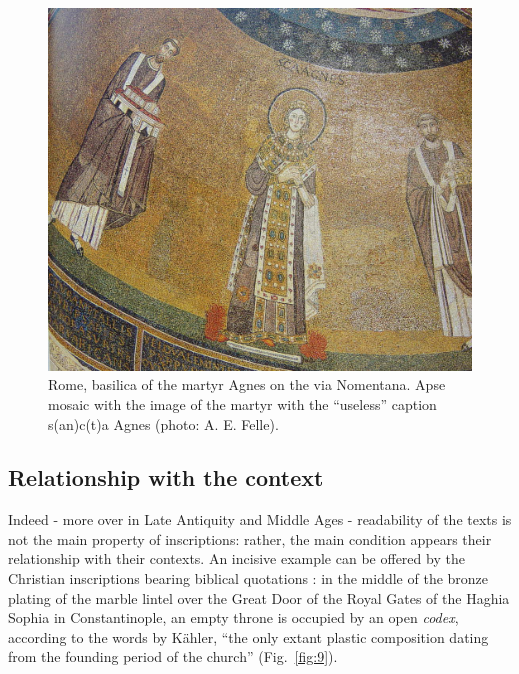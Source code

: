 \documentclass[amsthm,ebook]{saparticle}
\begin{document}
\begin{figure}[!bp]
\centering
 \includegraphics[width=\columnwidth]{FelleVisualFeaturesofinscriptionsEAGLE2016FullPaper-img011.jpg}
\caption{Rome, basilica of the martyr Agnes on the via Nomentana. Apse mosaic with the image of the martyr with the
“useless” caption  s(an)c(t)a Agnes (photo: A. E. Felle).}
\label{fig:8}
\end{figure}













\subsection{Relationship with the context}


\noindent Indeed - more over in Late Antiquity and Middle Ages - readability of the texts is not the main property of
inscriptions: rather, the main condition appears their relationship with their contexts. An incisive example can be
offered by the Christian inscriptions bearing biblical quotations \citep{felle_biblia_2006}: in the middle of the bronze
plating of the marble lintel over the Great Door of the Royal Gates of the Haghia Sophia in Constantinople, an empty
throne is occupied by an open \emph{codex}, according to the words by Kähler, ``the only extant plastic
composition dating from the founding period of the church'' \citep[29-30; 32][taff. 22; 62]{kahler_hagia_1967}
(Fig.~\ref{fig:9}).
\end{document}
